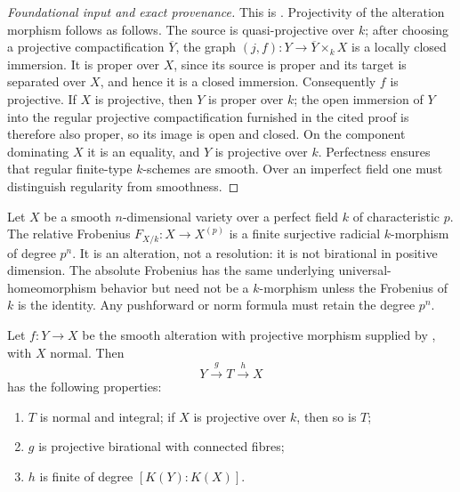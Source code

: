 \begin{proof}[Foundational input and exact provenance]
This is \cite[Theorem~4.1]{deJong1996}.  Projectivity of the alteration
morphism follows as follows.  The source is quasi-projective over \(k\);
after choosing a projective compactification \(\overline Y\), the graph
\((j,f):Y\to\overline Y\times_kX\) is a locally closed immersion.  It is
proper over \(X\), since its source is proper and its target is separated
over \(X\), and hence it is a closed immersion.
Consequently \(f\) is projective.  If \(X\) is projective, then \(Y\) is
proper over \(k\); the open immersion of \(Y\) into the regular projective
compactification furnished in the cited proof is therefore also proper,
so its image is open and closed.  On the component dominating \(X\) it is
an equality, and \(Y\) is projective over \(k\).  Perfectness ensures that
regular finite-type \(k\)-schemes are smooth.  Over an imperfect field one
must distinguish regularity from smoothness.
\end{proof}

\begin{example}
\label{ex:appB-frobenius-alteration}
Let \(X\) be a smooth \(n\)-dimensional variety over a perfect field \(k\) of
characteristic \(p\).  The relative Frobenius
\(F_{X/k}:X\to X^{(p)}\) is a finite surjective radicial \(k\)-morphism of
degree \(p^n\).  It is an alteration, not a resolution: it is not birational
in positive dimension.  The absolute Frobenius has the same underlying
universal-homeomorphism behavior but need not be a \(k\)-morphism unless the
Frobenius of \(k\) is the identity.  Any pushforward or norm formula must
retain the degree \(p^n\).
\end{example}

\begin{proposition}\label{prop:appB-alteration-stein-ledger}
Let \(f:Y\to X\) be the smooth alteration with projective morphism supplied by
, with \(X\) normal.  Then
\[
 Y\xrightarrow{g}T\xrightarrow{h}X
\]
has the following properties:
\begin{enumerate}
\item \(T\) is normal and integral; if \(X\) is projective over \(k\),
      then so is \(T\);
\item \(g\) is projective birational with connected fibres;
\item \(h\) is finite of degree \([K(Y):K(X)]\).
\end{enumerate}
\par
\end{proposition}

